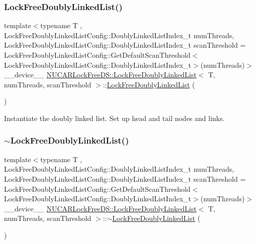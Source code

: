 \subsubsection{\texorpdfstring{Lock\+Free\+Doubly\+Linked\+List()}{LockFreeDoublyLinkedList()}}
{\footnotesize\ttfamily template$<$typename T , Lock\+Free\+Doubly\+Linked\+List\+Config\+::\+Doubly\+Linked\+List\+Index\+\_\+t num\+Threads, Lock\+Free\+Doubly\+Linked\+List\+Config\+::\+Doubly\+Linked\+List\+Index\+\_\+t scan\+Threshold = Lock\+Free\+Doubly\+Linked\+List\+Config\+::\+Get\+Default\+Scan\+Threshold$<$\+Lock\+Free\+Doubly\+Linked\+List\+Config\+::\+Doubly\+Linked\+List\+Index\+\_\+t$>$(num\+Threads)$>$ \\
\+\_\+\+\_\+device\+\_\+\+\_\+ \mbox{\hyperlink{class_n_u_c_a_r_lock_free_d_s_1_1_lock_free_doubly_linked_list}{N\+U\+C\+A\+R\+Lock\+Free\+D\+S\+::\+Lock\+Free\+Doubly\+Linked\+List}}$<$ T, num\+Threads, scan\+Threshold $>$\+::\mbox{\hyperlink{class_n_u_c_a_r_lock_free_d_s_1_1_lock_free_doubly_linked_list}{Lock\+Free\+Doubly\+Linked\+List}} (\begin{DoxyParamCaption}{ }\end{DoxyParamCaption})\hspace{0.3cm}{\ttfamily [inline]}}

Instantiate the doubly linked list. Set up head and tail nodes and links. \mbox{\label{class_n_u_c_a_r_lock_free_d_s_1_1_lock_free_doubly_linked_list_a1b9de53c0b80a9630783fb6376c768e4}} 
\subsubsection{\texorpdfstring{$\sim$\+Lock\+Free\+Doubly\+Linked\+List()}{~LockFreeDoublyLinkedList()}}
{\footnotesize\ttfamily template$<$typename T , Lock\+Free\+Doubly\+Linked\+List\+Config\+::\+Doubly\+Linked\+List\+Index\+\_\+t num\+Threads, Lock\+Free\+Doubly\+Linked\+List\+Config\+::\+Doubly\+Linked\+List\+Index\+\_\+t scan\+Threshold = Lock\+Free\+Doubly\+Linked\+List\+Config\+::\+Get\+Default\+Scan\+Threshold$<$\+Lock\+Free\+Doubly\+Linked\+List\+Config\+::\+Doubly\+Linked\+List\+Index\+\_\+t$>$(num\+Threads)$>$ \\
\+\_\+\+\_\+device\+\_\+\+\_\+ \mbox{\hyperlink{class_n_u_c_a_r_lock_free_d_s_1_1_lock_free_doubly_linked_list}{N\+U\+C\+A\+R\+Lock\+Free\+D\+S\+::\+Lock\+Free\+Doubly\+Linked\+List}}$<$ T, num\+Threads, scan\+Threshold $>$\+::$\sim$\mbox{\hyperlink{class_n_u_c_a_r_lock_free_d_s_1_1_lock_free_doubly_linked_list}{Lock\+Free\+Doubly\+Linked\+List}} (\begin{DoxyParamCaption}{ }\end{DoxyParamCaption})\hspace{0.3cm}{\ttfamily [inline]}}

